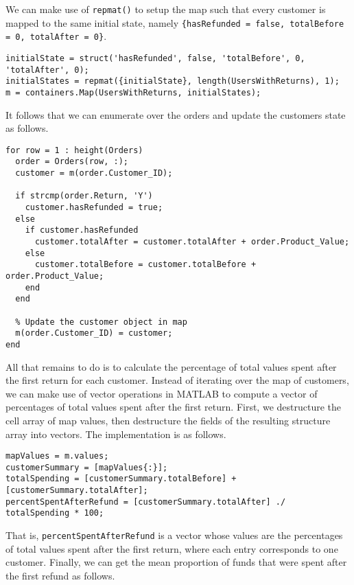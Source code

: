 \noindent
We can make use of \lstinline|repmat()| to setup the map such that every customer is mapped to the same initial state, namely \lstinline|{hasRefunded = false, totalBefore = 0, totalAfter = 0}|.

\begin{lstlisting}
initialState = struct('hasRefunded', false, 'totalBefore', 0, 'totalAfter', 0);
initialStates = repmat({initialState}, length(UsersWithReturns), 1);
m = containers.Map(UsersWithReturns, initialStates);
\end{lstlisting}

\noindent
It follows that we can enumerate over the orders and update the customers state as follows.

\begin{lstlisting}
for row = 1 : height(Orders)
  order = Orders(row, :);
  customer = m(order.Customer_ID);

  if strcmp(order.Return, 'Y')
    customer.hasRefunded = true;
  else
    if customer.hasRefunded
      customer.totalAfter = customer.totalAfter + order.Product_Value;
    else
      customer.totalBefore = customer.totalBefore + order.Product_Value;
    end
  end
  
  % Update the customer object in map
  m(order.Customer_ID) = customer;     
end
\end{lstlisting}

\noindent
All that remains to do is to calculate the percentage of total values spent after the first return for each customer. Instead of iterating over the map of customers, we can make use of vector operations in MATLAB to compute a vector of percentages of total values spent after the first return. First, we destructure the cell array of map values, then destructure the fields of the resulting structure array into vectors. The implementation is as follows.

\begin{lstlisting}
mapValues = m.values;
customerSummary = [mapValues{:}];
totalSpending = [customerSummary.totalBefore] + [customerSummary.totalAfter];
percentSpentAfterRefund = [customerSummary.totalAfter] ./ totalSpending * 100;
\end{lstlisting}

\noindent
That is, \lstinline|percentSpentAfterRefund| is a vector whose values are the percentages of total values spent after the first return, where each entry corresponds to one customer. Finally, we can get the mean proportion of funds that were spent after the first refund as follows.


